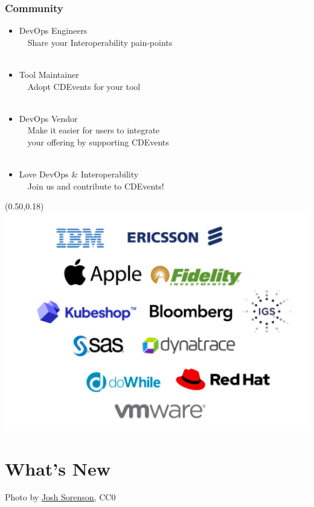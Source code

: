 \documentclass[aspectratio=169,11pt,hyperref={colorlinks=true}]{beamer}
\begin{document}
\begin{blackframe}
  \frametitle{Community}
  \begin{itemize}
    \item DevOps Engineers\\
            ~~Share your Interoperability pain-points\\~
    \item Tool Maintainer\\
            ~~Adopt CDEvents for your tool\\~
    \item DevOps Vendor\\
            ~~Make it easier for users to integrate\\
            ~~your offering by supporting CDEvents\\~
    \item Love DevOps \& Interoperability\\
            ~~Join us and contribute to CDEvents!
  \end{itemize}
  \begin{textblock*}{0.45\paperwidth}(0.50\paperwidth,0.18\paperheight)
    \includegraphics[width=0.45\paperwidth]{img/cdevents-community.png}
  \end{textblock*}
\end{blackframe}

\section{What's New}
\begin{sectionwithpiclargecentral}{Photo by \href{https://unsplash.com/@joshsorenson}{\underline{Josh Sorenson}}, CC0}
\end{sectionwithpiclargecentral}
\end{document}
